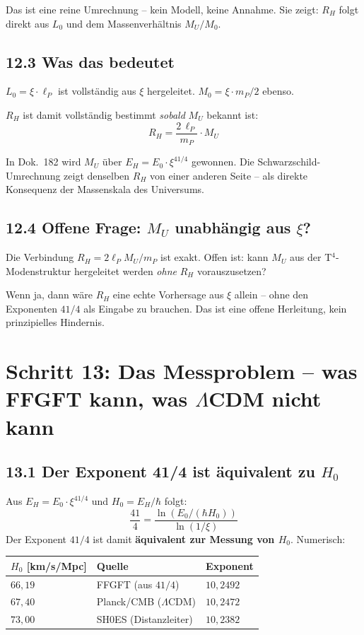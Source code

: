 Das ist eine reine Umrechnung -- kein Modell, keine Annahme.
Sie zeigt: $R_H$ folgt direkt aus $L_0$ und dem Massenverhältnis
$M_U/M_0$.

\subsection*{12.3 Was das bedeutet}

$L_0 = \xi\cdot\ell_P$ ist vollständig aus $\xi$ hergeleitet.
$M_0 = \xi\cdot m_P/2$ ebenso.

$R_H$ ist damit vollständig bestimmt \emph{sobald} $M_U$ bekannt ist:
\[
  R_H = \frac{2\,\ell_P}{m_P}\cdot M_U
\]

In Dok.~182 wird $M_U$ über $E_H = E_0\cdot\xi^{41/4}$ gewonnen.
Die Schwarzschild-Umrechnung zeigt denselben $R_H$ von einer anderen
Seite -- als direkte Konsequenz der Massenskala des Universums.

\subsection*{12.4 Offene Frage: $M_U$ unabhängig aus $\xi$?}

Die Verbindung $R_H = 2\ell_P M_U/m_P$ ist exakt.
Offen ist: kann $M_U$ aus der T$^4$-Modenstruktur hergeleitet werden
\emph{ohne} $R_H$ vorauszusetzen?

Wenn ja, dann wäre $R_H$ eine echte Vorhersage aus $\xi$ allein --
ohne den Exponenten $41/4$ als Eingabe zu brauchen.
Das ist eine offene Herleitung, kein prinzipielles Hindernis.

\section{Schritt 13: Das Messproblem -- was FFGFT kann, was $\Lambda$CDM nicht kann}

\subsection*{13.1 Der Exponent 41/4 ist äquivalent zu $H_0$}

Aus $E_H = E_0 \cdot \xi^{41/4}$ und $H_0 = E_H/\hbar$ folgt:
\[
  \frac{41}{4} = \frac{\ln(E_0/(\hbar H_0))}{\ln(1/\xi)}
\]
Der Exponent $41/4$ ist damit \textbf{äquivalent zur Messung von $H_0$}.
Numerisch:

\begin{center}
\begin{tabular}{lll}
\toprule
$H_0$ [km/s/Mpc] & Quelle & Exponent \\
\midrule
$66{,}19$ & FFGFT (aus $41/4$) & $10{,}2492$ \\
$67{,}40$ & Planck/CMB ($\Lambda$CDM) & $10{,}2472$ \\
$73{,}00$ & SH0ES (Distanzleiter) & $10{,}2382$ \\
\bottomrule
\end{tabular}
\end{center}

